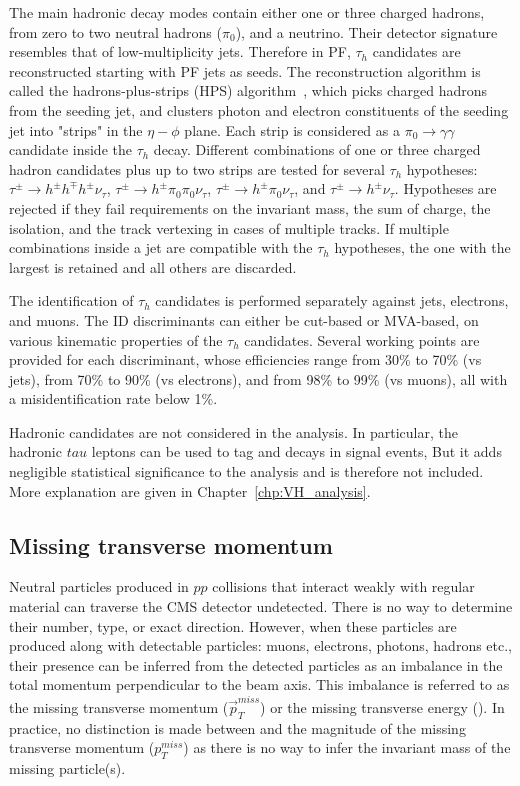 The main hadronic \tau{} decay modes contain either one or three charged hadrons, from zero to two neutral hadrons ($\pi_{0}$), and a neutrino.
Their detector signature resembles that of low-multiplicity jets.
Therefore in PF, $\tau_{h}$ candidates are reconstructed starting with PF jets as seeds. 
The reconstruction algorithm is called the hadrons-plus-strips (HPS) algorithm~\cite{tau2016, tau2018},
which picks charged hadrons from the seeding jet, and clusters photon and electron constituents of the seeding jet into "strips" in the $\eta-\phi$ plane.
Each strip is considered as a $\pi_{0} \to \gamma\gamma$ candidate inside the $\tau_{h}$ decay.
Different combinations of one or three charged hadron candidates plus up to two strips are tested for several $\tau_{h}$ hypotheses:
$\tau^{\pm} \to h^{\pm}h^{\mp}h^{\pm}\nu_{\tau}$, $\tau^{\pm} \to h^{\pm}\pi_{0}\pi_{0}\nu_{\tau}$,
$\tau^{\pm} \to h^{\pm}\pi_{0}\nu_{\tau}$, and $\tau^{\pm} \to h^{\pm}\nu_{\tau}$.
Hypotheses are rejected if they fail requirements on the invariant mass, the sum of charge, the isolation, and the track vertexing in cases of multiple tracks.
If multiple combinations inside a jet are compatible with the $\tau_{h}$ hypotheses, the one with the largest \pt is retained and all others are discarded.

The identification of $\tau_{h}$ candidates is performed separately against jets, electrons, and muons.
The ID discriminants can either be cut-based or MVA-based, on various kinematic properties of the $\tau_{h}$ candidates.
Several working points are provided for each discriminant, whose efficiencies range from 30\% to 70\% (vs jets), from 70\% to 90\% (vs electrons), and from 98\% to 99\% (vs muons),
all with a misidentification rate below 1\%.

Hadronic \tau{} candidates are not considered in the \hmm analysis.
In particular, the hadronic $tau$ leptons can be used to tag \PW and \PZ decays in \VH signal events,
But it adds negligible statistical significance to the analysis and is therefore not included.
More explanation are given in Chapter~\ref{chp:VH_analysis}.

\subsection{Missing transverse momentum}\label{sec:reco_met}

Neutral particles produced in $pp$ collisions that interact weakly with regular material can traverse the CMS detector undetected.
There is no way to determine their number, type, or exact direction.
However, when these particles are produced along with detectable particles: muons, electrons, photons, hadrons etc.,
their presence can be inferred from the detected particles as an imbalance in the total momentum perpendicular to the beam axis.
This imbalance is referred to as the missing transverse momentum ($\vec{p}^{miss}_{T}$) or the missing transverse energy (\MET).
In practice, no distinction is made between \MET and the magnitude of the missing transverse momentum ($p^{miss}_{T}$) 
as there is no way to infer the invariant mass of the missing particle(s).

